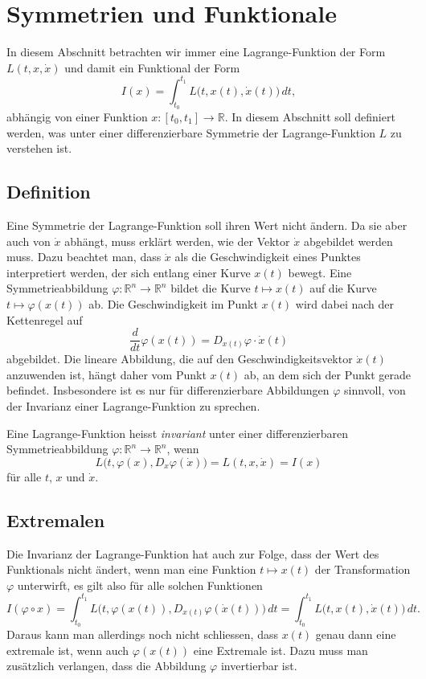 %
%
%
\section{Symmetrien und Funktionale
\label{buch:symmetrien:section:symmetrie}}
In diesem Abschnitt betrachten wir immer eine Lagrange-Funktion
der Form $L(t,x,\dot{x})$ und damit ein Funktional der Form
\[
I(x)
=
\int_{t_0}^{t_1}
L\bigl(t,x(t),\dot{x}(t)\bigr)\,dt,
\]
abhängig von einer Funktion $x\colon[t_0,t_1]\to\mathbb{R}$.
In diesem Abschnitt soll definiert werden, was unter einer
differenzierbare Symmetrie der Lagrange-Funktion $L$ zu verstehen
ist.

%
%
\subsection{Definition}
Eine Symmetrie der Lagrange-Funktion soll ihren Wert nicht ändern.
Da sie aber auch von $\dot{x}$ abhängt, muss erklärt werden, wie
der Vektor $\dot{x}$ abgebildet werden muss.
Dazu beachtet man, dass $\dot{x}$ als die Geschwindigkeit eines
Punktes interpretiert werden, der sich entlang einer Kurve $x(t)$
bewegt.
Eine Symmetrieabbildung $\varphi\colon\mathbb{R}^n\to\mathbb{R}^n$ 
bildet die Kurve $t\mapsto x(t)$ auf die Kurve $t\mapsto \varphi(x(t))$
ab. 
Die Geschwindigkeit im Punkt $x(t)$ wird dabei nach der Kettenregel
auf 
\[
\frac{d}{dt}\varphi(x(t))
=
D_{x(t)}\varphi\cdot \dot{x}(t)
\]
abgebildet.
Die lineare Abbildung, die auf den Geschwindigkeitsvektor $\dot{x}(t)$
anzuwenden ist, hängt daher vom Punkt $x(t)$ ab, an dem sich der
Punkt gerade befindet.
Insbesondere ist es nur für differenzierbare Abbildungen $\varphi$
sinnvoll, von der Invarianz einer Lagrange-Funktion zu sprechen.

\begin{definition}
Eine Lagrange-Funktion heisst {\em invariant} unter einer differenzierbaren
Symmetrieabbildung $\varphi\colon\mathbb{R}^n\to\mathbb{R}^n$, wenn
\[
L\bigl(t,\varphi(x), D_x\varphi(\dot{x})\bigr)
=
L(t,x,\dot{x})
=
I(x)
\]
für alle $t$, $x$ und $\dot{x}$.
\end{definition}

%
%
\subsection{Extremalen}
Die Invarianz der Lagrange-Funktion hat auch zur Folge, dass der
Wert des Funktionals nicht ändert, wenn man eine Funktion $t\mapsto x(t)$
der Transformation $\varphi$ unterwirft, es gilt also für alle
solchen Funktionen
\[
I(\varphi\circ x)
=
\int_{t_0}^{t_1}
L\bigl(t,\varphi(x(t)),D_{x(t)}\varphi(\dot{x}(t))\bigr)
\,dt
=
\int_{t_0}^{t_1}
L\bigl(t,x(t),\dot{x}(t)\bigr)
\,dt.
\]
Daraus kann man allerdings noch nicht schliessen, dass $x(t)$ genau
dann eine extremale ist, wenn auch $\varphi(x(t))$ eine Extremale ist.
Dazu muss man zusätzlich verlangen, dass die Abbildung $\varphi$
invertierbar ist.

